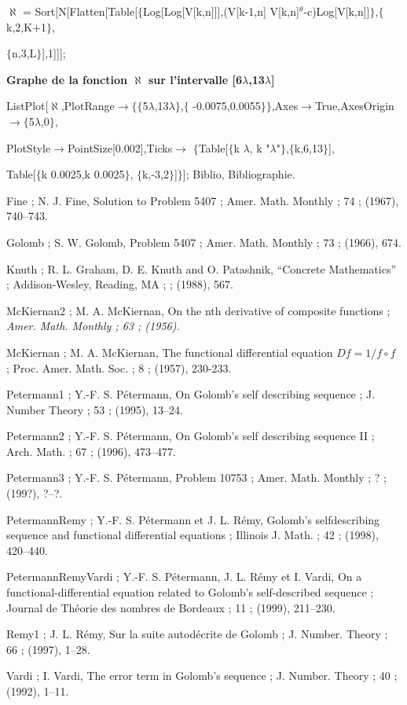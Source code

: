 \noindent
$\aleph$ = Sort[N[Flatten[Table[$\{$Log[Log[V[k,n]]],(V[k-1,n] V[k,n]$^{\theta}$-c)Log[V[k,n]]$\}$,$\{$k,2,K+1$\}$,

\noindent
$\{$n,3,L$\}$],1]]];
\medskip

\noindent
{\bf
Graphe de la fonction $\aleph$ sur l'intervalle [6$\lambda$,13$\lambda$]
}
\medskip

\noindent
ListPlot[$\aleph$,PlotRange$\rightarrow\{\{$5$\lambda$,13$\lambda\}$,$\{$
-0.0075,0.0055$\}\}$,Axes$\rightarrow$True,AxesOrigin$\rightarrow\{$5$\lambda$,0$\}$,

\noindent
PlotStyle$\rightarrow$PointSize[0.002],Ticks$\rightarrow$
$\{$Table[$\{$k $\lambda$, k "$\lambda$"$\}$,$\{$k,6,13$\}$],

\noindent
Table[$\{$k 0.0025,k 0.0025$\}$,
$\{$k,-3,2$\}$]$\}$];
\bigskip
\hfill\eject
\Secti Biblio, Bibliographie.

{\eightpts
\DefRef Fine ; N. J. Fine, Solution to Problem 5407 ; Amer. Math. Monthly ; 74 ; (1967), 740--743.

\DefRef Golomb ; S. W. Golomb, Problem 5407 ; Amer. Math. Monthly ; 73 ; (1966), 674.

\DefRef Knuth ; R. L. Graham, D. E. Knuth and O. Patashnik, ``Concrete Mathematics'' ; Addison-Wesley, Reading, MA ; { } ; $\!\!$(1988), 567.

\DefRef McKiernan2 ; M. A. McKiernan, On the nth derivative of composite functions ; \it Amer. Math. Monthly ; 63 ; (1956).

\DefRef McKiernan ; M. A. McKiernan, The functional differential equation $Df=1/f\circ f$ ; Proc. Amer. Math. Soc. ; 8 ; (1957), 230-233.

\DefRef Petermann1 ; Y.-F. S. P\'etermann, On Golomb's self describing sequence ; J. Number Theory ; 53 ; (1995), 13--24.

\DefRef Petermann2 ; Y.-F. S. P\'etermann, On Golomb's self describing sequence II ; Arch. Math. ; 67 ; (1996), 473--477.

\DefRef Petermann3 ; Y.-F. S. P\'etermann, Problem 10753 ; Amer. Math. Monthly ; ? ; (199?), ?--?.

\DefRef PetermannRemy ; Y.-F. S. P\'etermann et J. L. R\'emy, Golomb's selfdescribing sequence 
and functional differential equations ; Illinois J. Math. ; 42 ; (1998), 420--440.

\DefRef PetermannRemyVardi ; Y.-F. S. P\'etermann, J. L. R\'emy et I. Vardi, On a functional-differential equation related 
to Golomb's self-described sequence ; Journal de Th\'eorie des nombres de Bordeaux ; 11 ; (1999), 211--230.

\DefRef Remy1 ; J. L. R\'emy, Sur la suite autod\'ecrite de Golomb ; J. Number. Theory ; 66 ; (1997), 1--28.

\DefRef Vardi ; I. Vardi, The error term in Golomb's sequence ; J. Number. Theory ; 40 ; (1992), 1--11.
\par
}
